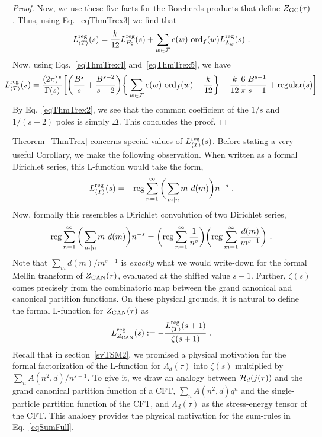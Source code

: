 \documentclass[11pt,a4paper]{article}
\newcommand{\G}{\Gamma}
\newcommand{\La}{\Lambda}
\newcommand{\reg}{{\rm reg}}
\begin{document}
\begin{proof}
Now, we use these five facts for the Borcherds products that define $Z_{\rm GC}(\tau)$. Thus, using Eq.~\eqref{eqThmTrex3} we find that
\begin{align}
L_{\langle T \rangle}^\reg(s) = \frac{k}{12} L_{E_2}^\reg(s) + \sum_{w \in \cal{F}}e(w) ~ {\rm ord}_f(w) L_{\La_w}^\reg(s)~. \label{eqThmTrex6}
\end{align}
Now, using Eqs.~\eqref{eqThmTrex4} and~\eqref{eqThmTrex5}, we have
\begin{align}
\!\!\!\!\!\!
L_{\langle T \rangle}^\reg(s) = \frac{(2 \pi)^s}{\G(s)}\bigg[ \bigg( \frac{B^s}{s}+ \frac{B^{s-2}}{s-2} \bigg) \bigg\{ \sum_{w \in \cal{F}} e(w) ~ {\rm ord}_f(w)-\frac{k}{12}  \bigg\} - \frac{k}{12} \frac{6}{\pi} \frac{B^{s-1}}{s-1} + {\rm regular}(s) \bigg] \!. \!\!\!\!\!\!
\end{align}
By Eq.~\eqref{eqThmTrex2}, we see that the common coefficient of the $1/s$ and $1/(s-2)$ poles is simply $\Delta$. This concludes the proof.
\end{proof}

Theorem~\ref{ThmTrex} concerns special values of $L_{\langle T \rangle}^\reg(s)$. Before stating a very useful Corollary, we make the following observation. When written as a formal Dirichlet series, this L-function would take the form,
\begin{align}
L_{\langle T \rangle}^\reg(s) = -\reg \sum_{n = 1}^{\infty} \bigg( \sum_{m|n} m~d(m) \bigg) n^{-s}~.
\end{align}
Now, formally this resembles a Dirichlet convolution of two Dirichlet series,
\begin{align}
\reg \sum_{n = 1}^{\infty} \bigg( \sum_{m|n} m~d(m) \bigg) n^{-s} = 
\bigg( \reg \sum_{n = 1}^{\infty} \frac{1}{n^s} \bigg) 
\bigg( \reg \sum_{m = 1}^{\infty} \frac{d(m)}{m^{s-1}} \bigg)~.
\end{align}
Note that $\sum_m d(m)/m^{s-1}$ is {\em exactly} what we would write-down for the formal Mellin transform of $Z_{\rm CAN}(\tau)$, evaluated at the shifted value $s-1$. Further, $\zeta(s)$ comes precisely from the combinatoric map between the grand canonical and canonical partition functions. On these physical grounds, it is natural to define the formal L-function for $Z_{\rm CAN}(\tau)$ as
\begin{align}
L_{Z_{\rm CAN}}^{\reg}(s):= -\frac{L_{\langle T \rangle}^\reg(s+1)}{\zeta(s+1)} ~. \label{eqLcan1}
\end{align}
Recall that in section~\ref{svTSM2}, we promised a physical motivation for the formal factorization of the L-function for $\Lambda_d(\tau)$ into $\zeta(s)$ multiplied by $\sum_n A(n^2,d)/n^{s-1}$. To give it, we draw an analogy between ${\cal H}_d(j(\tau))$ and the grand canonical partition function of a CFT, $\sum_n A(n^2,d) q^n$ and the single-particle partition function of the CFT, and $\Lambda_d(\tau)$ as the stress-energy tensor of the CFT. This analogy provides the physical motivation for the sum-rules in Eq.~\eqref{eqSumFull}. 
\end{document}
